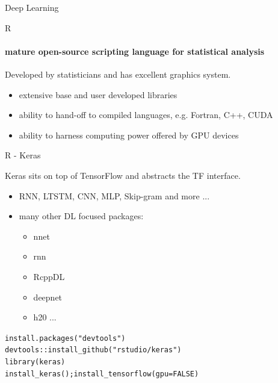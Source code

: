 \documentclass{beamer}
\begin{document}
\begin{darkframes}
\begin{frame}{Deep Learning}
    \end{frame}
    
    \begin{frame}{R}
      \framesubtitle{mature open-source scripting language for statistical analysis}
      \begin{block}
      {\small{Developed by statisticians and has excellent graphics system.}}
      \end{block}
      \bigskip
      \begin{itemize}
          \item extensive base and user developed libraries
          \item ability to hand-off to compiled languages, e.g. Fortran, C++, CUDA
          \item ability to harness computing power offered by GPU devices
      \end{itemize}
    \end{frame}
    
        \begin{frame}{R - Keras}
      \begin{block}
      {\small{Keras sits on top of TensorFlow and abstracts the TF interface.}}
      \begin{itemize}
          \item RNN, LTSTM, CNN, MLP, Skip-gram and more ...
          \item many other DL focused packages:
          \begin{itemize}
              \item nnet
              \item rnn
              \item RcppDL
              \item deepnet
              \item h20 ...
          \end{itemize}
      \end{itemize}
      \end{block}{\vspace*{-.4cm}}
        \tiny{\begin{alltt}
        install.packages("devtools") \\
        devtools::install\_github("rstudio/keras") \\
        library(keras) \\
        install\_keras(); install\_tensorflow(gpu = FALSE)
        \end{alltt}}
    \end{frame}
    

\end{darkframes}
\end{document}
